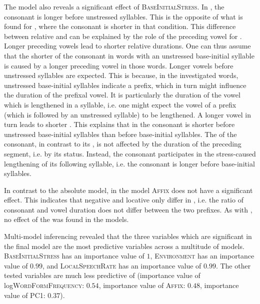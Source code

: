 The model also reveals a significant effect of \textsc{BaseInitialStress}. In , the consonant is longer before unstressed syllables. This is the opposite of what is found for , where the consonant is shorter in that condition. 
This difference between relative and  can be explained by the role of the preceding vowel for . Longer preceding vowels lead to shorter relative durations. One can thus assume that the shorter  of the consonant in words with an unstressed base-initial syllable is caused by a longer preceding vowel in those words.
Longer vowels before unstressed syllables are expected. This is because, in the investigated words, unstressed base-initial syllables indicate a  prefix, which in turn might influence the duration of the prefixal vowel. It is particularly the duration of the vowel which is lengthened in a  syllable, i.e. one might expect the vowel of a  prefix (which is followed by an unstressed syllable) to be lengthened. A longer vowel in turn leads to shorter . This explains that in  the consonant is shorter before unstressed base-initial syllables than before  base-initial syllables.
The  of the consonant, in contrast to its , is not affected by the duration of the preceding segment, i.e. by its  status. Instead, the consonant participates in the stress-caused lengthening of its following syllable, i.e. the consonant is longer before  base-initial syllables. %

In contrast to the absolute model, in the  model \textsc{Affix} does not have a significant effect. This indicates that negative and locative  only differ in , i.e. the ratio of consonant and vowel duration does not differ between the two prefixes. 
As with , no effect of the  was found in the  models. 

Multi-model inferencing revealed that the three variables which are significant in the final model are the most predictive variables across a multitude of models. \textsc{BaseInitialStress} has an importance value of $1$, \textsc{Environment}  has an importance value of $0.99$,  and  \textsc{LocalSpeechRate} has an importance value of $0.99$. The other tested variables are much less predictive of  (importance value of log\textsc{WordFormFrequency}: $0.54$, importance value of \textsc{Affix}: $0.48$, importance value of \textsc{PC1}: $0.37$). 


